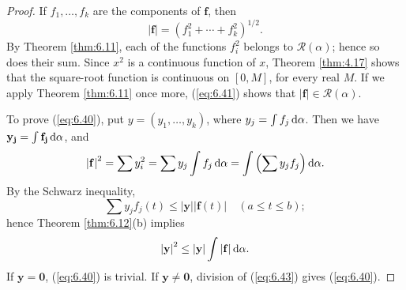 \begin{proof}
    If $f_1,\dots,f_k$ are the components of $\mathbf{f}$, then
    \begin{equation}
        \label{eq:6.41}
        \left| \mathbf{f} \right| = \left( f_1^2 + \cdots + f_k^2 \right)^{1/2}.
    \end{equation}
    By Theorem \ref{thm:6.11}, each of the functions $f_i^2$ belongs to $\mathscr{R}(\alpha)$; 
    hence so does their sum. 
    Since $x^2$ is a continuous function of $x$, 
    Theorem \ref{thm:4.17} shows that the square-root function is continuous on $[0, M]$, for every real $M$. 
    If we apply Theorem \ref{thm:6.11} once more, (\ref{eq:6.41}) shows that $\left| \mathbf{f} \right| \in \mathscr{R}(\alpha)$.

    To prove (\ref{eq:6.40}), put $y = (y_1, \dots, y_k)$, 
    where $y_j = \int f_j \d \alpha$. 
    Then we have $\mathbf{y_j} = \int \mathbf{f_j} \d \alpha$, and
    \begin{equation*}
        \left| \mathbf{f} \right|^2 = 
        \sum y_i^2 =
        \sum y_j \int f_j \d \alpha = 
        \int \left( \sum y_j f_j \right) \d \alpha .
    \end{equation*}
    By the Schwarz inequality,
    \begin{equation}
        \label{eq:6.42}
        \sum y_j f_j (t) \leq \left| \mathbf{y} \right| \left| \mathbf{f}(t) \right| 
        \quad 
        (a \leq t \leq b);
    \end{equation}
    hence Theorem \ref{thm:6.12}(b) implies
    \begin{equation}
        \label{eq:6.43}
        \left| \mathbf{y} \right|^2 \leq 
        \left| \mathbf{y} \right| \int \left| \mathbf{f} \right| \d \alpha.
    \end{equation}
    If $\mathbf{y = 0}$, (\ref{eq:6.40}) is trivial.
    If $\mathbf{y \neq 0}$, division of (\ref{eq:6.43}) gives (\ref{eq:6.40}).
\end{proof}
